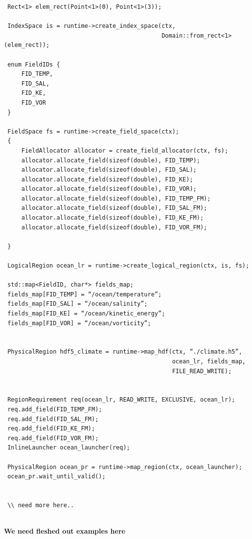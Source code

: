 \documentclass{article}
\begin{document}
 \begin{lstlisting}
 Rect<1> elem_rect(Point<1>(0), Point<1>(3));

 IndexSpace is = runtime->create_index_space(ctx,
                                             Domain::from_rect<1>(elem_rect));
 
 enum FieldIDs {
     FID_TEMP,
     FID_SAL,
     FID_KE,
     FID_VOR
 }
 
 FieldSpace fs = runtime->create_field_space(ctx);
 {
     FieldAllocator allocator = create_field_allocator(ctx, fs);
     allocator.allocate_field(sizeof(double), FID_TEMP);
     allocator.allocate_field(sizeof(double), FID_SAL);
     allocator.allocate_field(sizeof(double), FID_KE);
     allocator.allocate_field(sizeof(double), FID_VOR);
     allocator.allocate_field(sizeof(double), FID_TEMP_FM);
     allocator.allocate_field(sizeof(double), FID_SAL_FM);
     allocator.allocate_field(sizeof(double), FID_KE_FM);
     allocator.allocate_field(sizeof(double), FID_VOR_FM);
     
 }
 
 LogicalRegion ocean_lr = runtime->create_logical_region(ctx, is, fs);
 
 std::map<FieldID, char*> fields_map;
 fields_map[FID_TEMP] = “/ocean/temperature”;
 fields_map[FID_SAL] = “/ocean/salinity”;
 fields_map[FID_KE] = “/ocean/kinetic_energy”;
 fields_map[FID_VOR] = “/ocean/vorticity”;
 
 
 PhysicalRegion hdf5_climate = runtime->map_hdf(ctx, “./climate.h5”,
                                                ocean_lr, fields_map,
                                                FILE_READ_WRITE);


 RegionRequirement req(ocean_lr, READ_WRITE, EXCLUSIVE, ocean_lr);
 req.add_field(FID_TEMP_FM);
 req.add_field(FID_SAL_FM);
 req.add_field(FID_KE_FM);
 req.add_field(FID_VOR_FM);
 InlineLauncher ocean_launcher(req);

 PhysicalRegion ocean_pr = runtime->map_region(ctx, ocean_launcher);
 ocean_pr.wait_until_valid();


 \\ need more here.. 
 
 \end{lstlisting}
 

 
 \textbf{We need fleshed out examples here}
 
 
\end{document}

